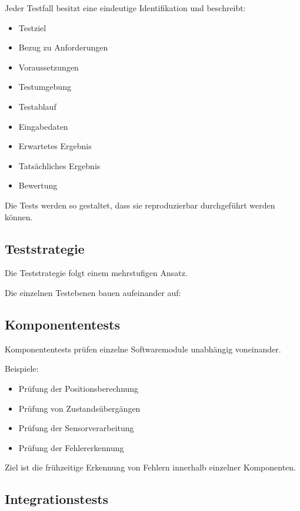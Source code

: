 Jeder Testfall besitzt eine eindeutige Identifikation und beschreibt:

\begin{itemize}
\tightlist
\item
  Testziel
\item
  Bezug zu Anforderungen
\item
  Voraussetzungen
\item
  Testumgebung
\item
  Testablauf
\item
  Eingabedaten
\item
  Erwartetes Ergebnis
\item
  Tatsächliches Ergebnis
\item
  Bewertung
\end{itemize}

Die Tests werden so gestaltet, dass sie reproduzierbar durchgeführt
werden können.

\subsection{Teststrategie}\label{teststrategie}

Die Teststrategie folgt einem mehrstufigen Ansatz.

Die einzelnen Testebenen bauen aufeinander auf:

\subsection{Komponententests}\label{komponententests}

Komponententests prüfen einzelne Softwaremodule unabhängig voneinander.

Beispiele:

\begin{itemize}
\tightlist
\item
  Prüfung der Positionsberechnung
\item
  Prüfung von Zustandsübergängen
\item
  Prüfung der Sensorverarbeitung
\item
  Prüfung der Fehlererkennung
\end{itemize}

Ziel ist die frühzeitige Erkennung von Fehlern innerhalb einzelner
Komponenten.

\subsection{Integrationstests}\label{integrationstests}

